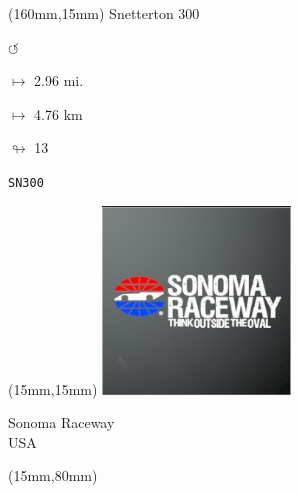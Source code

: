 \begin{textblock*}{40mm}(160mm,15mm)%
Snetterton 300
\par \Huge$\circlearrowleft$
\Large
\par$\mapsto$ 2.96 mi.
\par$\mapsto$ 4.76 km
\par$\looparrowright$ 13
\par\hfill\tiny\tt SN300\\
\end{textblock*}
\null\newpage

\begin{textblock*}{50mm}(15mm,15mm)%
\includegraphics[width=50mm]{LG/2015-05-20_00096.png}
\par Sonoma Raceway\\ USA
\end{textblock*}
\begin{textblock*}{185mm}(15mm,80mm)%
\end{textblock*}

